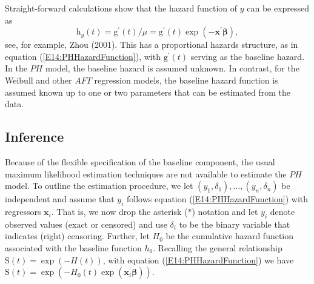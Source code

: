 Straight-forward calculations show that the hazard function of $y$
can be expressed as
\begin{equation*}
\mathrm{h}_y(t) = \mathrm{g}^{\prime}(t) / \mu  =
\mathrm{g}^{\prime}(t) \exp (- \mathbf{x}^{\prime} \boldsymbol \beta
),
\end{equation*}
see, for example, Zhou (2001). This has a proportional hazards
structure, as in equation (\ref{E14:PHHazardFunction}), with
$\mathrm{g}^{\prime}(t)$ serving as the baseline hazard. In the $PH$
model, the baseline hazard is assumed unknown. In contrast, for the
Weibull and other $AFT$ regression models, the baseline hazard
function is assumed known up to one or two parameters that can be
estimated from the data.



\subsection{Inference}\label{S14:PHInference}

Because of the flexible specification of the baseline component, the
usual maximum likelihood estimation techniques are not available to
estimate the $PH$ model. To outline the estimation procedure, we let
$(y_1, \delta_1), \ldots, (y_n, \delta_n)$ be independent and assume
that $y_i$ follows equation (\ref{E14:PHHazardFunction}) with
regressors $\mathbf{x}_i$. That is, we now drop the asterisk
($\ast$) notation and let $y_i$ denote observed values (exact or
censored) and use $\delta_i$ to be the binary variable that
indicates (right) censoring. Further, let $H_0$ be the cumulative
hazard function associated with the baseline function $h_0$.
Recalling the general relationship $\mathrm{S}(t) = \exp (-H(t))$,
with equation (\ref{E14:PHHazardFunction}) we have $\mathrm{S}(t) =
\exp \left(-H_0(t)\exp( \mathbf{x}_i^{\prime} \boldsymbol \beta
)\right).$

